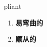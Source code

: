 
\begin{frame}
{\huge pliant}
\begin{center}
\begin{enumerate}\Large
  \item \textbf{易弯曲的}
  \item \textbf{顺从的}
\end{enumerate}
\end{center}
\end{frame}

